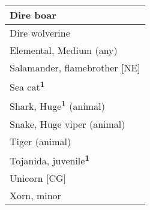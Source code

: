 \begin{longtable}{ll}
{\begin{minipage}[t]{3.857in}
Dire boar\end{minipage}}\\
\hline
\multicolumn{2}{|p{3.857in}|}{\begin{minipage}[t]{3.857in}\raggedright
Dire wolverine\end{minipage}}\\
\hline
\multicolumn{2}{|p{3.857in}|}{\begin{minipage}[t]{3.857in}\raggedright
Elemental, Medium (any)\end{minipage}}\\
\hline
\multicolumn{2}{|p{3.857in}|}{\begin{minipage}[t]{3.857in}\raggedright
Salamander, flamebrother [NE]\end{minipage}}\\
\hline
\multicolumn{2}{|p{3.857in}|}{\begin{minipage}[t]{3.857in}\raggedright
Sea cat\textsuperscript{\textbf{1}}\end{minipage}}\\
\hline
\multicolumn{2}{|p{3.857in}|}{\begin{minipage}[t]{3.857in}\raggedright
Shark, Huge\textsuperscript{\textbf{1}}\textbf{} (animal)\end{minipage}}\\
\hline
\multicolumn{2}{|p{3.857in}|}{\begin{minipage}[t]{3.857in}\raggedright
Snake, Huge viper (animal)\end{minipage}}\\
\hline
\multicolumn{2}{|p{3.857in}|}{\begin{minipage}[t]{3.857in}\raggedright
Tiger (animal)\end{minipage}}\\
\hline
\multicolumn{2}{|p{3.857in}|}{\begin{minipage}[t]{3.857in}\raggedright
Tojanida, juvenile\textsuperscript{\textbf{1}}\end{minipage}}\\
\hline
\multicolumn{2}{|p{3.857in}|}{\begin{minipage}[t]{3.857in}\raggedright
Unicorn [CG]\end{minipage}}\\
\hline
\multicolumn{2}{|p{3.857in}|}{\begin{minipage}[t]{3.857in}\raggedright
Xorn, minor\end{minipage}}\\

\end{longtable}
